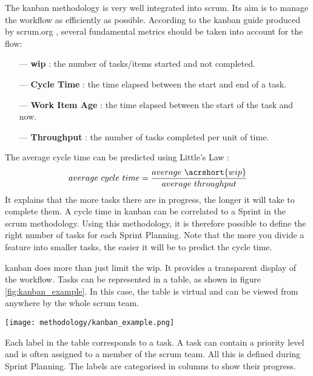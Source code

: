 The \gls{kanban} methodology is very well integrated into \gls{scrum}. Its aim is to manage the workflow as efficiently as possible. According to the \gls{kanban} guide produced by \gls{scrum}.org \cite{kanban_guide}, several fundamental metrics should be taken into account for the flow:
\begin{itemize}
    \item[—] \textbf{\acrfull{wip}} : the number of tasks/items started and not completed.
    \item[—] \textbf{Cycle Time} : the time elapsed between the start and end of a task.
    \item[—] \textbf{Work Item Age} : the time elapsed between the start of the task and now.
    \item[—] \textbf{Throughput} : the number of tasks completed per unit of time.
\end{itemize}
The average cycle time can be predicted using Little's Law \cite{little_law}:
\begin{equation}
    average\ cycle\ time = \frac{average\ \acrshort{wip}}{average\ throughput}
\end{equation}
It explains that the more tasks there are in progress, the longer it will take to complete them. A cycle time in \gls{kanban} can be correlated to a Sprint in the \gls{scrum} methodology. Using this methodology, it is therefore possible to define the right number of tasks for each Sprint Planning. Note that the more you divide a feature into smaller tasks, the easier it will be to predict the cycle time.

\gls{kanban} does more than just limit the \acrshort{wip}. It provides a transparent display of the workflow. Tasks can be represented in a table, as shown in figure \ref{fig:kanban_example}. In this case, the table is virtual and can be viewed from anywhere by the whole \gls{scrum} team.
\begin{center}
    \begingroup
    \texttt{[image: methodology/kanban\_example.png]}
    \label{fig:kanban_example}
    \endgroup
\end{center}
Each label in the table corresponds to a task. A task can contain a priority level and is often assigned to a member of the \gls{scrum} team. All this is defined during Sprint Planning. The labels are categorised in columns to show their progress.


